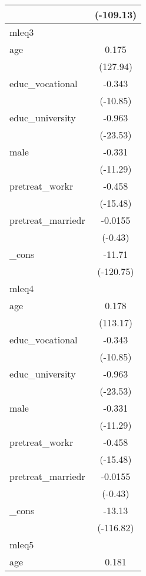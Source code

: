 {\begin{tabular}{l*{1}{c}}
            &   (-109.13)         \\
\hline
mleq3       &                     \\
age         &       0.175\sym{***}\\
            &    (127.94)         \\
[1em]
educ\_vocational&      -0.343\sym{***}\\
            &    (-10.85)         \\
[1em]
educ\_university&      -0.963\sym{***}\\
            &    (-23.53)         \\
[1em]
male        &      -0.331\sym{***}\\
            &    (-11.29)         \\
[1em]
pretreat\_workr&      -0.458\sym{***}\\
            &    (-15.48)         \\
[1em]
pretreat\_marriedr&     -0.0155         \\
            &     (-0.43)         \\
[1em]
\_cons      &      -11.71\sym{***}\\
            &   (-120.75)         \\
\hline
mleq4       &                     \\
age         &       0.178\sym{***}\\
            &    (113.17)         \\
[1em]
educ\_vocational&      -0.343\sym{***}\\
            &    (-10.85)         \\
[1em]
educ\_university&      -0.963\sym{***}\\
            &    (-23.53)         \\
[1em]
male        &      -0.331\sym{***}\\
            &    (-11.29)         \\
[1em]
pretreat\_workr&      -0.458\sym{***}\\
            &    (-15.48)         \\
[1em]
pretreat\_marriedr&     -0.0155         \\
            &     (-0.43)         \\
[1em]
\_cons      &      -13.13\sym{***}\\
            &   (-116.82)         \\
\hline
mleq5       &                     \\
age         &       0.181\sym{***}\\

\end{tabular}}
